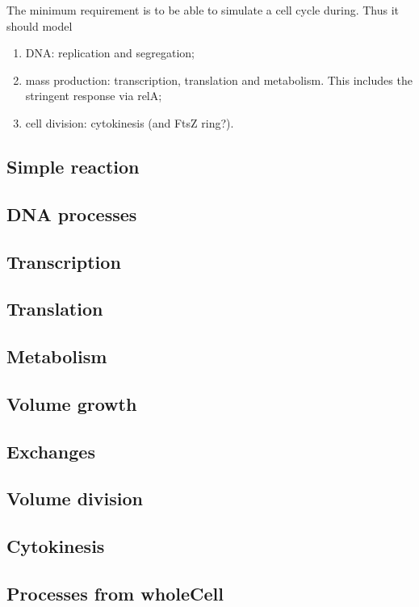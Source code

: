 The minimum requirement is to be able to simulate a cell cycle during. Thus it should model
\begin{enumerate}
  \item DNA: replication and segregation;
  \item mass production: transcription, translation and metabolism. This includes the stringent response via relA;
  \item cell division: cytokinesis (and FtsZ ring?).
\end{enumerate}



\subsection{Simple reaction}


\subsection{DNA processes}


\subsection{Transcription}


\subsection{Translation}


\subsection{Metabolism}


\subsection{Volume growth}


\subsection{Exchanges}


\subsection{Volume division}


\subsection{Cytokinesis}


\subsection{Processes from wholeCell}

